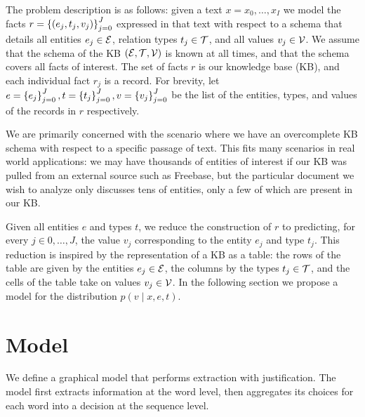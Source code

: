 \documentclass[12pt]{article}
\begin{document}
The problem description is as follows:
given a text $x = x_0, \ldots, x_{I}$ we model the facts
$r = \left\{(e_j, t_j, v_j)\right\}_{j=0}^J$ expressed in that text
with respect to a schema that details all entities $e_j \in \mathcal{E}$,
relation types $t_j \in \mathcal{T}$, and all values $v_j \in \mathcal{V}$.
We assume that the schema of the KB $(\mathcal{E}, \mathcal{T}, \mathcal{V})$ is known at all times,
and that the schema covers all facts of interest.
The set of facts $r$ is our knowledge base (KB),
and each individual fact $r_j$ is a record.
For brevity, let $e = \left\{e_j\right\}_{j=0}^J, t = \left\{t_j\right\}_{j=0}^J, v = \left\{v_j\right\}_{j=0}^J$
be the list of the entities, types, and values of the records in $r$ respectively.

We are primarily concerned with the scenario where we have an overcomplete KB schema with
respect to a specific passage of text.
This fits many scenarios in real world applications:
we may have thousands of entities of interest if our KB was pulled from an 
external source such as Freebase,
but the particular document we wish to analyze only discusses tens of entities,
only a few of which are present in our KB.

Given all entities $e$ and types $t$,
we reduce the construction of $r$ to predicting, for every $j\in 0,\ldots,J$,
the value $v_j$ corresponding to the entity $e_j$ and type $t_j$.
This reduction is inspired by the representation of a KB as a table:
the rows of the table are given by the entities $e_j \in \mathcal{E}$,
the columns by the types $t_j \in \mathcal{T}$,
and the cells of the table take on values $v_j \in \mathcal{V}$.
In the following section we propose a model for the distribution $p(v \mid x, e, t)$.

\section{Model}
We define a graphical model that performs extraction with justification. 
The model first extracts information at the word level,
then aggregates its choices for each word into a decision at the sequence level.
\end{document}
